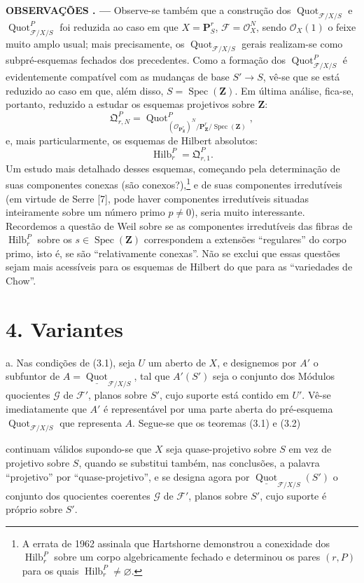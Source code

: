 \documentclass[11pt,twoside,openany]{book}
\numberwithin{equation}{section}
\newcommand{\src}[1]{%
  \phantomsection\hypertarget{src:#1}{}%
  \marginpar{\raggedleft\footnotesize\sffamily #1}%
}
\theoremstyle{plain}
\theoremstyle{definition}
\theoremstyle{remark}
\newcommand{\fsection}[2]{%
  \section*{#1. #2}%
  \addcontentsline{toc}{section}{#1. #2}%
}
\newcommand{\result}[2]{%
  \par\medskip\noindent\textbf{#1%
  \if\relax\detokenize{#2}\relax\else\space#2\fi. ---}\enspace
}
\newcommand{\FgaUnitKey}{frontmatter}
\renewcommand{\src}[1]{%
  \phantomsection\hypertarget{src:\FgaUnitKey:#1}{}%
  \marginpar{\raggedleft\footnotesize\sffamily #1}%
}
\begin{document}
\result{OBSERVAÇÕES}{3.9} Observe-se também que a construção dos
$\operatorname{Quot}_{\mathcal F/X/S}$ e
$\operatorname{Quot}^P_{\mathcal F/X/S}$ foi reduzida ao caso em que
$X=\mathbf P^r_S$, $\mathcal F=\mathcal O_X^N$, sendo $\mathcal O_X(1)$ o
feixe muito amplo usual; mais precisamente, os
$\operatorname{Quot}_{\mathcal F/X/S}$ gerais realizam-se como
subpré-esquemas fechados dos precedentes. Como a formação dos
$\operatorname{Quot}^P_{\mathcal F/X/S}$ é evidentemente compatível com as
mudanças de base $S'\longrightarrow S$, vê-se que se está reduzido ao caso em
que, além disso, $S=\operatorname{Spec}(\mathbf Z)$. Em última análise, fica-se,
portanto, reduzido a estudar os esquemas projetivos sobre $\mathbf Z$:
\[
\mathfrak Q^P_{r,N}=
\operatorname{Quot}^{P}_{(\mathcal O_{\mathbf P^r_{\mathbf Z}})^N/
\mathbf P^r_{\mathbf Z}/\operatorname{Spec}(\mathbf Z)},
\]
e, mais particularmente, os esquemas de Hilbert absolutos:
\[
\operatorname{Hilb}^P_r=\mathfrak Q^P_{r,1}.
\]
Um estudo mais detalhado desses esquemas, começando pela determinação de suas
componentes conexas (são conexos?),\footnote{A errata de 1962 assinala que
Hartshorne demonstrou a conexidade dos $\operatorname{Hilb}^P_r$ sobre um
corpo algebricamente fechado e determinou os pares $(r,P)$ para os quais
$\operatorname{Hilb}^P_r\neq\varnothing$.} e de suas componentes irredutíveis
(em virtude de Serre [7], pode haver componentes irredutíveis situadas
inteiramente sobre um número primo $p\neq0$), seria muito interessante.
Recordemos a questão de Weil sobre se as componentes irredutíveis das fibras de
$\operatorname{Hilb}^P_r$ sobre os $s\in\operatorname{Spec}(\mathbf Z)$
correspondem a extensões ``regulares'' do corpo primo, isto é, se são
``relativamente conexas''. Não se exclui que essas questões sejam mais
acessíveis para os esquemas de Hilbert do que para as ``variedades de Chow''.

\fsection{4}{Variantes}

\noindent a. Nas condições de (3.1), seja $U$ um aberto de $X$, e designemos
por $A'$ o subfuntor de
$A=\underline{\operatorname{Quot}}_{\mathcal F/X/S}$, tal que $A'(S')$ seja
o conjunto dos Módulos quocientes $\mathcal G$ de $\mathcal F'$, planos sobre
$S'$, cujo suporte está contido em $U'$. Vê-se imediatamente que $A'$ é
representável por uma parte aberta do pré-esquema
$\operatorname{Quot}_{\mathcal F/X/S}$ que representa $A$. Segue-se que os
teoremas (3.1) e (3.2)
\src{267}
continuam válidos supondo-se que $X$ seja quase-projetivo sobre $S$ em vez de
projetivo sobre $S$, quando se substitui também, nas conclusões, a palavra
``projetivo'' por ``quase-projetivo'', e se designa agora por
$\underline{\operatorname{Quot}}_{\mathcal F/X/S}(S')$ o conjunto dos
quocientes coerentes $\mathcal G$ de $\mathcal F'$, planos sobre $S'$, cujo
suporte é próprio sobre $S'$.
\end{document}
